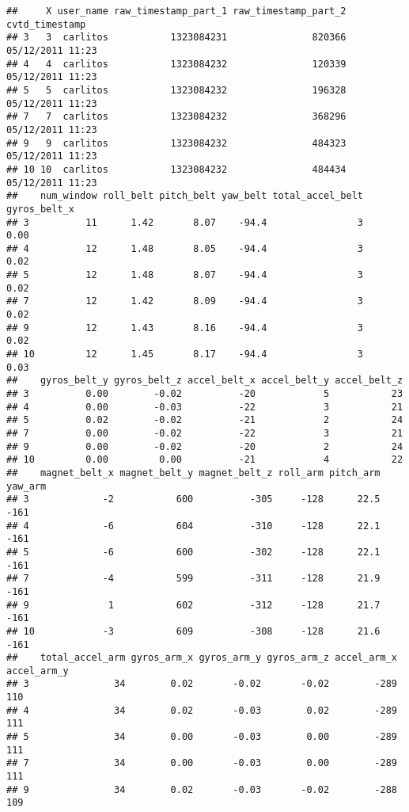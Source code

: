 \documentclass[]{article}
\begin{document}
\begin{verbatim}
##     X user_name raw_timestamp_part_1 raw_timestamp_part_2   cvtd_timestamp
## 3   3  carlitos           1323084231               820366 05/12/2011 11:23
## 4   4  carlitos           1323084232               120339 05/12/2011 11:23
## 5   5  carlitos           1323084232               196328 05/12/2011 11:23
## 7   7  carlitos           1323084232               368296 05/12/2011 11:23
## 9   9  carlitos           1323084232               484323 05/12/2011 11:23
## 10 10  carlitos           1323084232               484434 05/12/2011 11:23
##    num_window roll_belt pitch_belt yaw_belt total_accel_belt gyros_belt_x
## 3          11      1.42       8.07    -94.4                3         0.00
## 4          12      1.48       8.05    -94.4                3         0.02
## 5          12      1.48       8.07    -94.4                3         0.02
## 7          12      1.42       8.09    -94.4                3         0.02
## 9          12      1.43       8.16    -94.4                3         0.02
## 10         12      1.45       8.17    -94.4                3         0.03
##    gyros_belt_y gyros_belt_z accel_belt_x accel_belt_y accel_belt_z
## 3          0.00        -0.02          -20            5           23
## 4          0.00        -0.03          -22            3           21
## 5          0.02        -0.02          -21            2           24
## 7          0.00        -0.02          -22            3           21
## 9          0.00        -0.02          -20            2           24
## 10         0.00         0.00          -21            4           22
##    magnet_belt_x magnet_belt_y magnet_belt_z roll_arm pitch_arm yaw_arm
## 3             -2           600          -305     -128      22.5    -161
## 4             -6           604          -310     -128      22.1    -161
## 5             -6           600          -302     -128      22.1    -161
## 7             -4           599          -311     -128      21.9    -161
## 9              1           602          -312     -128      21.7    -161
## 10            -3           609          -308     -128      21.6    -161
##    total_accel_arm gyros_arm_x gyros_arm_y gyros_arm_z accel_arm_x accel_arm_y
## 3               34        0.02       -0.02       -0.02        -289         110
## 4               34        0.02       -0.03        0.02        -289         111
## 5               34        0.00       -0.03        0.00        -289         111
## 7               34        0.00       -0.03        0.00        -289         111
## 9               34        0.02       -0.03       -0.02        -288         109

\end{verbatim}
\end{document}
